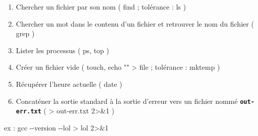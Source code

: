 \documentclass[11pt,a4paper]{article}
\newcommand{\TTBF}[1]{\texttt{\textbf{#1}}}
\begin{document}
\begin{enumerate}[label=\Alph*]
\item Chercher un fichier par son nom  ( find ; tolérance : ls )
\item Chercher un mot dans le contenu d'un fichier et retrouver le nom du fichier  ( grep )
\item Lister les processus  ( ps, top )
\item Créer un fichier vide  ( touch, echo "" > file ; tolérance : mktemp )
\item Récupérer l'heure actuelle  ( date )
\item Concaténer la sortie standard à la sortie d'erreur vers un fichier nommé \TTBF{out-err.txt}  \linebreak ( > out-err.txt 2>\&1 )
\end{enumerate}

ex : gcc -{}-version -{}-lol > lol 2>\&1
\end{document}
